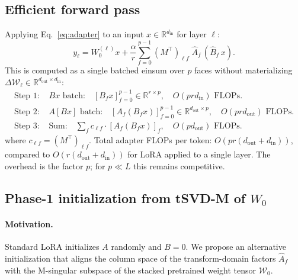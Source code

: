 \documentclass{article}
\newcommand{\R}{\mathbb{R}}
\newcommand{\cW}{\mathcal{W}}
\newcommand{\DeltaW}{\Delta\mathcal{W}}
\newcommand{\transpose}{^{\!\top}}
\theoremstyle{plain}
\begin{document}
\subsection{Efficient forward pass}
\label{sec:forward}

Applying Eq.~\eqref{eq:adapter} to an input $x \in \R^{d_{\mathrm{in}}}$ for layer $\ell$:
\begin{equation}
  y_\ell = W_0^{(\ell)} x +
  \frac{\alpha}{r} \sum_{f=0}^{p-1} (M\transpose)_{\ell f}\; \hat{A}_f\, (\hat{B}_f\, x).
  \label{eq:forward}
\end{equation}
This is computed as a single batched einsum over $p$ faces without materializing
$\DeltaW_\ell \in \R^{d_{\mathrm{out}} \times d_{\mathrm{in}}}$:
\begin{align*}
  \text{Step 1: } & B x \text{ batch:} \quad
    [B_f x]_{f=0}^{p-1} \in \R^{r \times p},
    \quad O(p r d_{\mathrm{in}}) \text{ FLOPs.} \\
  \text{Step 2: } & A [Bx] \text{ batch:} \quad
    [A_f (B_f x)]_{f=0}^{p-1} \in \R^{d_{\mathrm{out}} \times p},
    \quad O(p r d_{\mathrm{out}}) \text{ FLOPs.} \\
  \text{Step 3: } & \text{Sum:} \quad
    \sum_f c_{\ell f} \cdot [A_f(B_f x)]_f,
    \quad O(p d_{\mathrm{out}}) \text{ FLOPs.}
\end{align*}
where $c_{\ell f} = (M\transpose)_{\ell f}$.
Total adapter FLOPs per token: $O(pr(d_{\mathrm{out}} + d_{\mathrm{in}}))$,
compared to $O(r(d_{\mathrm{out}} + d_{\mathrm{in}}))$ for LoRA applied to
a single layer.
The overhead is the factor $p$; for $p \ll L$ this remains competitive.

\subsection{Phase-1 initialization from tSVD-M of $W_0$}
\label{sec:init}

\paragraph{Motivation.}
Standard LoRA initializes $A$ randomly and $B = 0$.
We propose an alternative initialization that aligns the column space of the
transform-domain factors $\hat{A}_f$ with the M-singular subspace of the
stacked pretrained weight tensor $\cW_0$.
\end{document}
